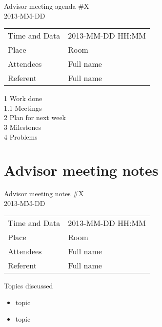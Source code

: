 \begin{center}
Advisor meeting agenda \#X\\
2013-MM-DD\\
\end{center}

\begin{table}[H]
\begin{center}
\begin{tabular}{ l | l }
Time and Data & 2013-MM-DD HH:MM \\
Place & Room \\
Attendees & Full name \\
Referent & Full name \\
\end{tabular}
\end{center}
\end{table}

1 Work done \\
1.1 Meetings \\
2 Plan for next week \\
3 Milestones \\
4 Problems \\

\clearpage
\section{Advisor meeting notes}

\begin{center}
Advisor meeting notes \#X \\
2013-MM-DD \\
\end{center}

\begin{table}[H]
\begin{center}
\begin{tabular}{ l | l }
Time and Data & 2013-MM-DD HH:MM \\
Place & Room \\
Attendees & Full name \\
Referent & Full name \\
\end{tabular}
\end{center}
\end{table}

Topics discussed
\begin{itemize}
\item topic
\item topic
\end{itemize}
 
